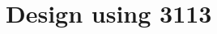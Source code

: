  \begin{center}




 \end{center}



\section{Design using 3113}


 \begin{center}




 \end{center}




